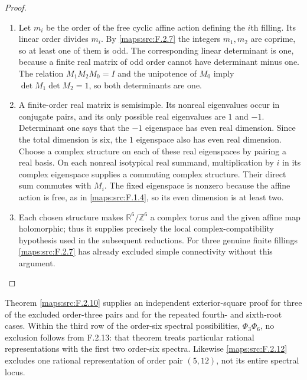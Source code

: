 \begin{proof}
\begin{enumerate}[label=\arabic*.]
\item Let $m_i$ be the order of the free cyclic affine action
defining the $i$th filling.  Its linear order divides $m_i$.
By \ref{maps:src:F.2.7} the integers $m_1,m_2$ are coprime, so at least one
of them is odd.  The corresponding linear determinant is
one, because a finite real matrix of odd order cannot have
determinant minus one.  The relation
$M_1M_2M_0=I$ and the unipotence of $M_0$ imply
$\det M_1\det M_2=1$, so both determinants are one.

\item A finite-order real matrix is semisimple.  Its nonreal
eigenvalues occur in conjugate pairs, and its only possible
real eigenvalues are $1$ and $-1$.  Determinant one says
that the $-1$ eigenspace has even real dimension.  Since the
total dimension is six, the $1$ eigenspace also has even
real dimension.  Choose a complex structure on each of
these real eigenspaces by pairing a real basis.  On each
nonreal isotypical real summand, multiplication by $i$ in
its complex eigenspace supplies a commuting complex
structure.  Their direct sum commutes with $M_i$.
The fixed eigenspace is nonzero because the affine action
is free, as in \ref{maps:src:F.1.4}, so its even dimension is at least two.

\item Each chosen structure makes $\mathbb R^6/\mathbb Z^6$ a
complex torus and the given affine map holomorphic; thus it
supplies precisely the local complex-compatibility
hypothesis used in the subsequent reductions.  For three genuine
finite fillings \ref{maps:src:F.2.7} has already excluded simple
connectivity without this argument.

\end{enumerate}
\end{proof}


Theorem \ref{maps:src:F.2.10} supplies an independent exterior-square
proof for three of the excluded order-three pairs and for
the repeated fourth- and sixth-root cases.
Within the third row of the order-six spectral possibilities,
$\Phi_3\Phi_6$, no exclusion follows from F.2.13: that theorem
treats particular rational representations with the first
two order-six spectra.  Likewise \ref{maps:src:F.2.12} excludes one
rational representation of order pair $(5,12)$, not its
entire spectral locus.

